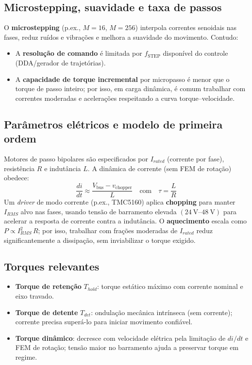 \subsection{Microstepping, suavidade e taxa de passos}
O \textbf{microstepping} (p.ex., \(M=16\), \(M=256\)) interpola correntes senoidais nas fases, reduz ruídos e vibrações e melhora a suavidade do movimento. Contudo:
\begin{itemize}
	\item A \textbf{resolução de comando} é limitada por \(f_{\text{STEP}}\) disponível do controle (DDA/gerador de trajetórias).
	\item A \textbf{capacidade de torque incremental} por micropasso é menor que o torque de passo inteiro; por isso, em carga dinâmica, é comum trabalhar com correntes moderadas e acelerações respeitando a curva torque–velocidade.
\end{itemize}

\subsection{Parâmetros elétricos e modelo de primeira ordem}
Motores de passo bipolares são especificados por \(I_{rated}\) (corrente por fase), resistência \(R\) e indutância \(L\).
A dinâmica de corrente (sem FEM de rotação) obedece:
\[
\frac{di}{dt} \approx \frac{V_{\text{bus}} - v_{\text{chopper}}}{L}
\quad\text{com}\quad
\tau = \frac{L}{R}
\]
Um \emph{driver} de modo corrente (p.ex., TMC5160) aplica \textbf{chopping} para manter \(I_{RMS}\) alvo nas fases, usando tensão de barramento elevada \((\SIrange{24}{48}{\volt})\) para acelerar a resposta de corrente contra a indutância. O \textbf{aquecimento} escala como \(P \propto I_{RMS}^{2}\,R\); por isso, trabalhar com frações moderadas de \(I_{rated}\) reduz significantemente a dissipação, sem inviabilizar o torque exigido.

\subsection{Torques relevantes}
\begin{itemize}
	\item \textbf{Torque de retenção} \(T_{hold}\): torque estático máximo com corrente nominal e eixo travado.
	\item \textbf{Torque de detente} \(T_{det}\): ondulação mecânica intrínseca (sem corrente); corrente precisa superá-lo para iniciar movimento confiável.
	\item \textbf{Torque dinâmico}: decresce com velocidade elétrica pela limitação de \(di/dt\) e FEM de rotação; tensão maior no barramento ajuda a preservar torque em regime.
\end{itemize}

